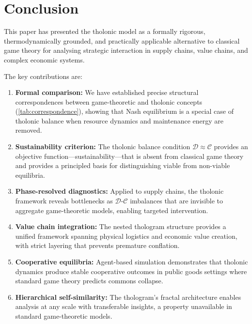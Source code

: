 \documentclass[12pt,a4paper,twocolumn]{article}
\newcommand{\D}{\mathcal{D}}
\newcommand{\CC}{\mathcal{C}}
\begin{document}
\section{Conclusion}
\label{sec:conclusion}

This paper has presented the tholonic model as a formally rigorous, thermodynamically grounded, and practically applicable alternative to classical game theory for analysing strategic interaction in supply chains, value chains, and complex economic systems.

The key contributions are:

\begin{enumerate}[nosep]
  \item \textbf{Formal comparison:} We have established precise structural correspondences between game-theoretic and tholonic concepts (\cref{tab:correspondence}), showing that Nash equilibrium is a special case of tholonic balance when resource dynamics and maintenance energy are removed.

  \item \textbf{Sustainability criterion:} The tholonic balance condition $\D \approx \CC$ provides an objective function---sustainability---that is absent from classical game theory and provides a principled basis for distinguishing viable from non-viable equilibria.

  \item \textbf{Phase-resolved diagnostics:} Applied to supply chains, the tholonic framework reveals bottlenecks as $\D$-$\CC$ imbalances that are invisible to aggregate game-theoretic models, enabling targeted intervention.

  \item \textbf{Value chain integration:} The nested thologram structure provides a unified framework spanning physical logistics and economic value creation, with strict layering that prevents premature conflation.

  \item \textbf{Cooperative equilibria:} Agent-based simulation demonstrates that tholonic dynamics produce stable cooperative outcomes in public goods settings where standard game theory predicts commons collapse.

  \item \textbf{Hierarchical self-similarity:} The thologram's fractal architecture enables analysis at any scale with transferable insights, a property unavailable in standard game-theoretic models.
\end{enumerate}
\end{document}
